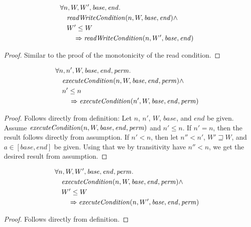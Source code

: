 \documentclass{article}
\newcommand{\var}[1]{\mathit{#1}}
\newcommand{\start}{\var{base}}
\newcommand{\addrend}{\var{end}}
\newcommand{\perm}{\var{perm}}
\newcommand{\plainfun}[2]{
  \ifthenelse{\equal{#2}{}}
             {\mathit{#1}}
             {\mathit{#1}(#2)}
}
\newcommand{\writeCond}[1]{\plainfun{readWriteCondition}{#1}}
\newcommand{\execCond}[1]{\plainfun{executeCondition}{#1}}
\newcommand{\future}{\mathbin{\sqsupseteq}}
\begin{document}
\begin{lemma}
\label{lem:writeCond-mono-world}
  \begin{align*}
    & \forall n,W, W',\start, \addrend \ldotp\\
    &\quad \writeCond{n,W,\start,\addrend} \land\\
    &\quad  W' \leq W\\
    &\qquad \Rightarrow \writeCond{n,W',\start,\addrend}
  \end{align*}
\end{lemma}
\begin{proof}
  Similar to the proof of the monotonicity of the read condition.
\end{proof}

\begin{lemma}
  \begin{align*}
    &\forall n,n',W,\start, \addrend, \perm \ldotp \\
    &\quad  \execCond{n,W,\start,\addrend,\perm} \land \\
    &\quad  n' \leq n \\
    &\qquad \Rightarrow \execCond{n',W,\start,\addrend,\perm}
  \end{align*}
\end{lemma}
\begin{proof}
  Follows directly from definition: Let $n$, $n'$, $W$, $\start$, and $\addrend$ be given. Assume $\execCond{n,W,\start,\addrend,\perm}$ and $n' \leq n$. If $n' = n$, then the result follows directly from assumption. If $n' < n$, then let $n'' < n'$, $W' \future W$, and $a \in [\start,\addrend]$ be given. Using that we by transitivity have $n'' < n$, we get the desired result from assumption.
\end{proof}

\begin{lemma}
\label{lem:execCond-mono-world}
  \begin{align*}
    &\forall n,W, W',\start, \addrend, \perm \ldotp \\
    &\quad  \execCond{n,W,\start,\addrend,\perm} \land \\
    &\quad  W' \leq W \\
    &\qquad \Rightarrow \execCond{n,W',\start,\addrend,\perm}
  \end{align*}
\end{lemma}
\begin{proof}
  Follows directly from definition.
\end{proof}
\end{document}
